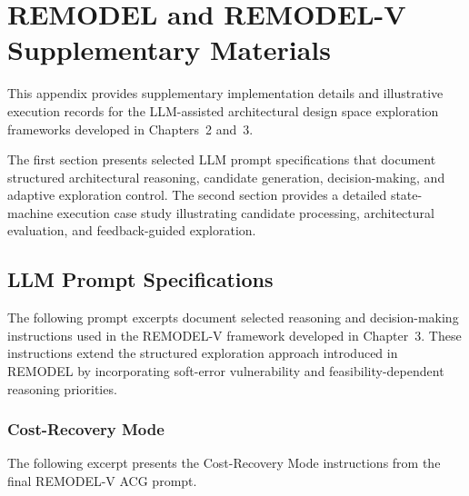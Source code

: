 
\chapter{REMODEL and REMODEL-V Supplementary Materials}
\label{app:remodel_supplementary}

This appendix provides supplementary
implementation details and illustrative
execution records for the LLM-assisted
architectural design space exploration
frameworks developed in Chapters~2 and~3.

The first section presents selected
LLM prompt specifications that document
structured architectural reasoning,
candidate generation, decision-making,
and adaptive exploration control.
The second section provides a detailed
state-machine execution case study
illustrating candidate processing,
architectural evaluation, and
feedback-guided exploration.

\section{LLM Prompt Specifications}
\label{app:llm_prompt_specifications}

The following prompt excerpts document
selected reasoning and decision-making
instructions used in the REMODEL-V
framework developed in Chapter~3.
These instructions extend the
structured exploration approach
introduced in REMODEL by incorporating
soft-error vulnerability and
feasibility-dependent reasoning
priorities.


\subsection{Cost-Recovery Mode}
\label{app:remodelv_prompts_mode1}


The following excerpt presents the Cost-Recovery Mode
instructions from the final REMODEL-V ACG prompt.

